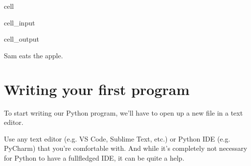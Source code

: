 \documentclass[letterpaper,10pt,english]{jupyterBook}
\begin{document}
\begin{sphinxuseclass}{cell}\begin{sphinxVerbatimInput}

\begin{sphinxuseclass}{cell_input}
\begin{sphinxVerbatim}[commandchars=\\\{\}]
  
  
  

          
\end{sphinxVerbatim}

\end{sphinxuseclass}\end{sphinxVerbatimInput}
\begin{sphinxVerbatimOutput}

\begin{sphinxuseclass}{cell_output}
\begin{sphinxVerbatim}[commandchars=\\\{\}]
Sam eats the apple.
\end{sphinxVerbatim}

\end{sphinxuseclass}\end{sphinxVerbatimOutput}

\end{sphinxuseclass}

\section{Writing your first program}
\label{\detokenize{first-program:writing-your-first-program}}
\sphinxAtStartPar
To start writing our Python program, we’ll have to open up a new file in a text editor.

\sphinxAtStartPar
Use any text editor (e.g. VS Code, Sublime Text, etc.) or Python IDE (e.g. PyCharm) that you’re comfortable with.
And while it’s completely not necessary for Python to have a full\sphinxhyphen{}fledged IDE, it can be quite a help.
\end{document}
